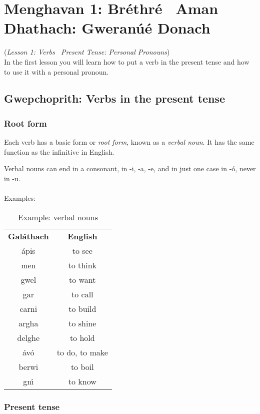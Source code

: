 \section{Menghavan 1: Br\'{e}thr\'{e} \textendash\ Aman Dhathach:  Gweran\'{u}\'{e} Donach}
(\textit{Lesson 1: Verbs \textendash\ Present Tense: Personal Pronouns})\\

In the first lesson you will learn how to put a verb in the present tense and how to use it with a personal pronoun.

\subsection{Gwepchoprith: Verbs in the present tense}

\subsubsection{Root form}

Each verb has a basic form or \textit{root form}, known as a \textit{verbal noun}. It has the same function as the infinitive in English.

Verbal nouns can end in a consonant, in -i, -a, -e, and in just one case in -\'{o}, never in -u.\\\\
Examples:
\begin{table}[H]
\centering
\begin{tabular}{cc}
  \toprule
  \textbf{Gal\'{a}thach} & \textbf{English}\\
  \cmidrule(lr){1-1}\cmidrule{2-2}
  \'{a}pis & to see\\
  men & to think\\
  gwel & to want\\
  gar & to call\\
  carni & to build\\
  argha & to shine\\
  delghe & to hold\\
  \'{a}v\'{o} & to do, to make\\
  berwi & to boil\\
  gn\'{\i} & to know\\
  \bottomrule
\end{tabular}
\caption{Example: verbal nouns}
\label{example_verbal_nouns}
\end{table}

\subsubsection{Present tense}

